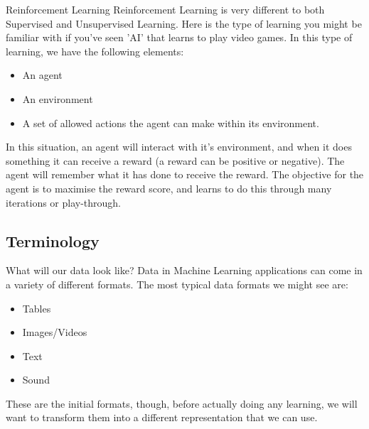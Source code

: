 \documentclass[10pt]{beamer}
\begin{document}
\begin{frame}[label={sec:orgb46a473}]{Reinforcement Learning}
Reinforcement Learning is very different to both Supervised and Unsupervised
Learning. Here is the type of learning you might be familiar with if you've seen 'AI'
that learns to play video games. In this type of learning, we have the following
elements:

\begin{itemize}
\item An agent
\item An environment
\item A set of allowed actions the agent can make within its environment.
\end{itemize}

In this situation, an agent will interact with it's environment, and when it does
something it can receive a reward (a reward can be positive or negative). The agent
will remember what it has done to receive the reward. The objective for the agent is
to maximise the reward score, and learns to do this through many iterations or
play-through.
\end{frame}

\subsection*{Terminology}
\label{sec:orgd396531}

\begin{frame}[label={sec:org02481da}]{What will our data look like?}
Data in Machine Learning applications can come in a variety of different formats. The
most typical data formats we might see are:

\begin{itemize}
\item Tables
\item Images/Videos
\item Text
\item Sound
\end{itemize}

These are the initial formats, though, before actually doing any learning, we will
want to transform them into a different representation that we can use.
\end{frame}
\end{document}
